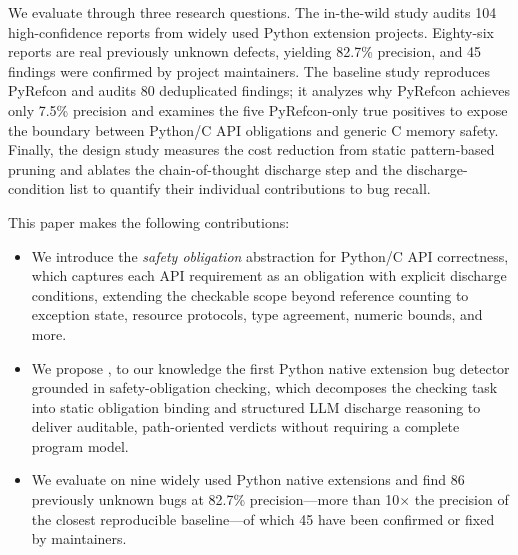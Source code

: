 We evaluate \tool through three research questions. The in-the-wild study
audits 104 high-confidence reports from widely used Python extension projects.
Eighty-six reports are real previously unknown defects, yielding 82.7\%
precision, and 45 findings were confirmed by project maintainers. The baseline
study reproduces PyRefcon and audits 80 deduplicated findings; it analyzes
why PyRefcon achieves only 7.5\% precision and examines the five
PyRefcon-only true positives to expose the boundary between Python/C API
obligations and generic C memory safety. Finally, the design study measures
the cost reduction from static pattern-based pruning and ablates the
chain-of-thought discharge step and the discharge-condition list to quantify
their individual contributions to bug recall.

This paper makes the following contributions:

\begin{itemize}
  \item We introduce the \emph{safety obligation} abstraction for Python/C API
  correctness, which captures each API requirement as an obligation with
  explicit discharge conditions, extending the checkable scope beyond reference
  counting to exception state, resource protocols, type agreement, numeric
  bounds, and more.
  \item We propose \tool, to our knowledge the first Python native extension bug
  detector grounded in safety-obligation checking, which decomposes the checking
  task into static obligation binding and structured LLM discharge reasoning to
  deliver auditable, path-oriented verdicts without requiring a complete program
  model.
  \item We evaluate \tool on nine widely used Python native extensions and find
  86 previously unknown bugs at 82.7\% precision---more than 10$\times$ the
  precision of the closest reproducible baseline---of which 45 have been
  confirmed or fixed by maintainers.
\end{itemize}
